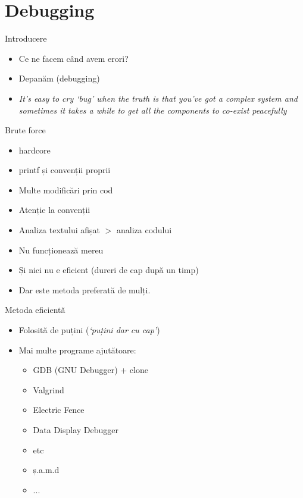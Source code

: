 \documentclass{beamer}
\begin{document}
\section{Debugging}
\frame{\tableofcontents[currentsection]}

\begin{frame}{Introducere}
\begin{itemize}
\item Ce ne facem când avem erori?
\item \pause Depanăm (debugging)
\item \pause \textit{It's easy to cry `bug' when the truth is that you've got a complex system and sometimes it takes a while to get all the components to co-exist peacefully}
\end{itemize}
\end{frame}

\begin{frame}{Brute force}
\begin{itemize}
\item hardcore
\item \pause printf și convenții proprii
\item \pause Multe modificări prin cod
\item \pause Atenție la convenții
\item \pause Analiza textului afișat $>$ analiza codului
\item \pause Nu funcționează mereu
\item \pause Și nici nu e eficient \pause(dureri de cap după un timp)
\item \pause Dar este metoda preferată de mulți.
\end{itemize}
\end{frame}

\begin{frame}{Metoda eficientă}
\begin{itemize}
\item Folosită de puțini \pause(\textit{`puțini dar cu cap'})
\item \pause Mai multe programe ajutătoare:
\begin{itemize}
\item GDB (GNU Debugger) + clone
\item Valgrind
\item Electric Fence
\item Data Display Debugger
\item etc
\item ș.a.m.d
\item ...
\end{itemize}
\end{itemize}
\end{frame}
\end{document}
